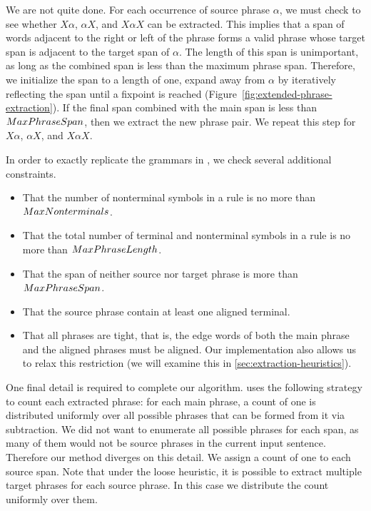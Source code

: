 We are not quite done.  For each occurrence of source phrase
$\alpha$, we must check to see whether $X\alpha$, $\alpha{}X$, 
and $X\alpha{}X$ can be extracted.  This implies that a span
of words adjacent to the right or left of the phrase forms 
a valid phrase whose target span is adjacent to the target
span of $\alpha$.  The length of this span is unimportant,
as long as the combined span is less than the maximum phrase
span.  Therefore, we initialize the span to a length of one, %
expand away from $\alpha$ by iteratively reflecting the 
span until a fixpoint is reached
(Figure~\ref{fig:extended-phrase-extraction}).  If the 
final span combined with the main span is less than
$MaxPhraseSpan$, then we extract the new phrase pair.
We repeat this step for $X\alpha$, $\alpha{}X$, and $X\alpha{}X$.
 
In order to exactly replicate the grammars in \citet{Chiang:2007:cl}, 
we check several additional constraints.

\begin{itemize}
	\item That the number of nonterminal symbols in a rule is no more than $MaxNonterminals$.
	\item That the total number of terminal and nonterminal symbols in a rule is no more than $MaxPhraseLength$.
	\item That the span of neither source nor target phrase is more than $MaxPhraseSpan$.
	\item That the source phrase contain at least one aligned terminal.
	\item That all phrases are tight, that is, the edge words of both
	the main phrase and the aligned phrases must be aligned.  Our implementation
	also allows us to relax this restriction (we will examine this in
		\textsection\ref{sec:extraction-heuristics}).
\end{itemize}

One final detail is required to complete our algorithm.  \citet{Chiang:2007:cl}
uses the following strategy to count each extracted phrase: for each main
phrase, a count of one is distributed uniformly over all possible phrases
that can be formed from it via subtraction.  We did not want to enumerate
all possible phrases for each span, as many of them would not be source phrases
in the current input sentence. Therefore our method diverges 
on this detail.  We assign a count of one to each source span.  
Note that under the loose heuristic, it is possible to extract multiple target
phrases for each source phrase.  In this case we distribute the count uniformly
over them.

